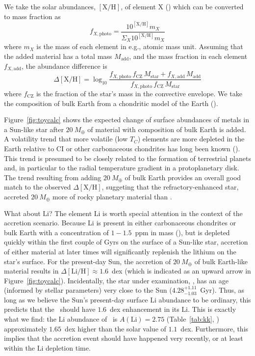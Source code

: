 \documentclass[modern, letterpaper]{aastex61}
\newcommand{\figname}{Figure}
\newcommand*\elem[1]{\ensuremath{\mathrm{#1}}}
\newcommand*\elemH[1]{\ensuremath{[\mathrm{#1}/\elem{H}]}}
\newcommand{\sunanalog}{\text{Krios}}
\newcommand{\bizarreone}{\text{Kronos}}
\newcommand{\Tcondens}{\ensuremath{T_C}}
\newcommand{\mearth}{\ensuremath{M_\oplus}}
\begin{document}
We take the solar abundances, $\elemH{X}$, of element \elem{X}
(\citealt{Asplund:2009aa}) which can be converted to mass fraction as
\begin{equation}
  f_{X,\mathrm{photo}} = \frac{10^{\elemH{X}} m_X}{\Sigma_X 10^{\elemH{X}} m_X}
\end{equation}
where $m_X$ is the mass of each element in e.g., atomic mass unit.
Assuming that the added material has a total mass $M_\mathrm{add}$, and the
mass fraction in each element $f_{X,\mathrm{add}}$,
the abundance difference is
\begin{equation}
  \Delta\elemH{X} = \log_{10} \frac{f_{X,\mathrm{photo}}\,f_\mathrm{CZ}\,M_\mathrm{star}
    + f_{X,\mathrm{add}}\,M_\mathrm{add}}
    {f_{X,\mathrm{photo}}\,f_\mathrm{CZ}\,M_\mathrm{star}}
\end{equation}
where $f_\mathrm{CZ}$ is the fraction of the star's mass in the convective envelope.
We take the composition of bulk Earth from a chondritic model of the Earth
(\citealt{mcdonough2001composition}).

Figure~\ref{fig:toycalc} shows the expected change of surface abundances of
metals in a Sun-like star after $20~\mearth$ of material with composition of
bulk Earth is added.
A volatility trend that more volatile (low \Tcondens) elements are more
depleted in the Earth relative to CI or other carbonaceous chondrites
has long been known (\citealt{mcdonough2001composition}).
This trend is presumed to be closely related to the formation of terrestrial
planets and, in particular to the radial temperature gradient in a
protoplanetary disk.
The trend resulting from adding $20~\mearth$ of bulk Earth
provides an overall good match to the observed $\Delta\elemH{X}$,
suggeting that the refractory-enhanced star, \bizarreone\,
accreted $20~\mearth$ more of rocky planetary material than \sunanalog.

What about \elem{Li}?
The element \elem{Li} is worth special attention in the context of the
accretion scenario.
Because Li is present in either carbonaceous chondrites or bulk Earth with
a concentration of $1-1.5$~ppm in mass (\citealt{mcdonough2001composition}),
but is depleted quickly within the first couple of Gyrs on the surface of a
Sun-like star, accretion of either material at later times will significantly
replenish the lithium on the star's surface.
For the present-day Sun, the accretion of $20~\mearth$ of bulk Earth-like
material results in $\Delta\elemH{Li} \approx 1.6$~dex (which
is indicated as an upward arrow in \figname~\ref{fig:toycalc}).
Incidentally, the star under examination, \bizarreone, has an age (informed by
stellar parameters) very close to the Sun ($4.28_{-1.03}^{+1.11}$~Gyr).
Thus, as long as we believe the Sun's present-day surface \elem{Li} abundance
to be ordinary, this predicts that the \bizarreone\ should have $1.6$~dex
enhancement in its \elem{Li}.
This is exactly what we find: the \elem{Li} abundance of \bizarreone\ is
$A(\elem{Li}) = 2.75$ (Table~\ref{tab:kk}, \citealt{jmlithium})
approximately $1.65$~dex higher than the solar value of $1.1$~dex.
Furthermore, this implies that the accretion event should have happened very
recently, or at least within the \elem{Li} depletion time.
\end{document}
